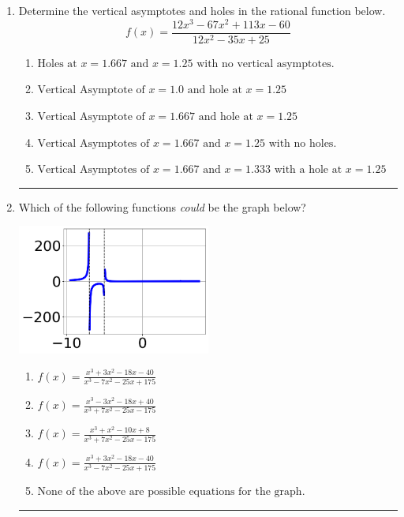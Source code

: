 \documentclass[14pt]{extbook}
\newcommand{\litem}[1]{\item#1\hspace*{-1cm}\rule{\textwidth}{0.4pt}}
\begin{document}
\begin{enumerate}
{\begin{enumerate}[label=\Alph*.]
\end{enumerate} }
\litem{
Determine the vertical asymptotes and holes in the rational function below.\[ f(x) = \frac{12x^{3} -67 x^{2} +113 x -60}{12x^{2} -35 x + 25} \]\begin{enumerate}[label=\Alph*.]
\item \( \text{Holes at } x = 1.667 \text{ and } x = 1.25 \text{ with no vertical asymptotes.} \)
\item \( \text{Vertical Asymptote of } x = 1.0 \text{ and hole at } x = 1.25 \)
\item \( \text{Vertical Asymptote of } x = 1.667 \text{ and hole at } x = 1.25 \)
\item \( \text{Vertical Asymptotes of } x = 1.667 \text{ and } x = 1.25 \text{ with no holes.} \)
\item \( \text{Vertical Asymptotes of } x = 1.667 \text{ and } x = 1.333 \text{ with a hole at } x = 1.25 \)

\end{enumerate} }
\litem{
Which of the following functions \textit{could} be the graph below?
\begin{center}
    \includegraphics[width=0.5\textwidth]{../Figures/identifyGraphOfRationalFunctionCopyA.png}
\end{center}
\begin{enumerate}[label=\Alph*.]
\item \( f(x)=\frac{x^{3} +3 x^{2} -18 x -40}{x^{3} -7 x^{2} -25 x + 175} \)
\item \( f(x)=\frac{x^{3} -3 x^{2} -18 x + 40}{x^{3} +7 x^{2} -25 x -175} \)
\item \( f(x)=\frac{x^{3} + x^{2} -10 x + 8}{x^{3} +7 x^{2} -25 x -175} \)
\item \( f(x)=\frac{x^{3} +3 x^{2} -18 x -40}{x^{3} -7 x^{2} -25 x + 175} \)
\item \( \text{None of the above are possible equations for the graph.} \)


\end{enumerate}}
\end{enumerate}
\end{document}
